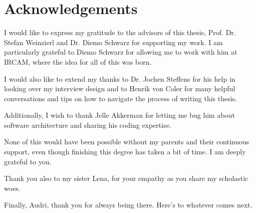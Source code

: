 
\section*{Acknowledgements}
I would like to express my gratitude to the advisors of this thesis, Prof. Dr.
Stefan Weinzierl and Dr. Diemo Schwarz for supporting my work. I am particularly
grateful to Diemo Schwarz for allowing me to work with him at IRCAM, where the
idea for all of this was born.

\bigskip
\noindent
I would also like to extend my thanks to Dr. Jochen Steffens for his help in
looking over my interview design and to Henrik von Coler for many helpful
conversations and tips on how to navigate the process of writing this thesis.

\bigskip
\noindent
Additionally, I wish to thank Jelle Akkerman for letting me bug him about
software architecture and sharing his coding expertise.

\bigskip
\noindent
None of this would have been possible without my parents and their continuous
support, even though finishing this degree has taken a bit of time. I am deeply
grateful to you.

\bigskip
\noindent
Thank you also to my sister Lena, for your empathy as you share my scholastic
woes.

\bigskip
\noindent
Finally, Audri, thank you for always being there. Here's to whatever comes next.

\newpage
